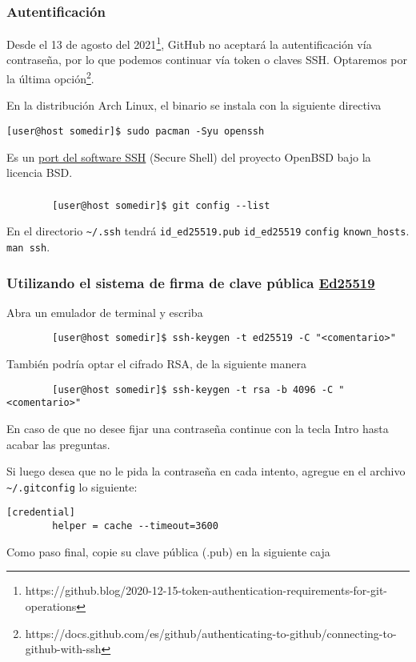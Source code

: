 \begin{frame}[fragile]
	\frametitle{Autentificación}
	Desde el 13 de agosto del 2021\footnote{https://github.blog/2020-12-15-token-authentication-requirements-for-git-operations}, GitHub no aceptará la autentificación vía contraseña, por lo que podemos continuar vía token o claves SSH. Optaremos por la última opción\footnote{https://docs.github.com/es/github/authenticating-to-github/connecting-to-github-with-ssh}.

	En la distribución Arch Linux, el binario se instala con la siguiente directiva
	\begin{verbatim}
[user@host somedir]$ sudo pacman -Syu openssh
    \end{verbatim}
	Es un \href{https://www.openssh.com}{port del software SSH} (Secure Shell) del proyecto OpenBSD bajo la licencia BSD.
\end{frame}

\begin{frame}[fragile]
	\frametitle{}
	\begin{verbatim}
		[user@host somedir]$ git config --list
	\end{verbatim}
	En el directorio \lstinline|~/.ssh| tendrá \lstinline|id_ed25519.pub| \lstinline|id_ed25519| \lstinline|config| \lstinline|known_hosts|.
	\lstinline|man ssh|.
\end{frame}

\begin{frame}[fragile]
	\frametitle{Utilizando el sistema de firma de clave pública \href{https://ed25519.cr.yp.to}{Ed25519}}
	Abra un emulador de terminal y escriba
	\begin{verbatim}
		[user@host somedir]$ ssh-keygen -t ed25519 -C "<comentario>"
	\end{verbatim}
	También podría optar el cifrado RSA, de la siguiente manera
	\begin{verbatim}
		[user@host somedir]$ ssh-keygen -t rsa -b 4096 -C "<comentario>"
	\end{verbatim}
	En caso de que no desee fijar una contraseña continue con la tecla Intro hasta acabar las preguntas.

	Si luego desea que no le pida la contraseña en cada intento, agregue en el archivo \lstinline|~/.gitconfig| lo siguiente:
	\begin{verbatim}
[credential]
        helper = cache --timeout=3600
	\end{verbatim}

	Como paso final, copie su clave pública (.pub) en la siguiente caja
\end{frame}

